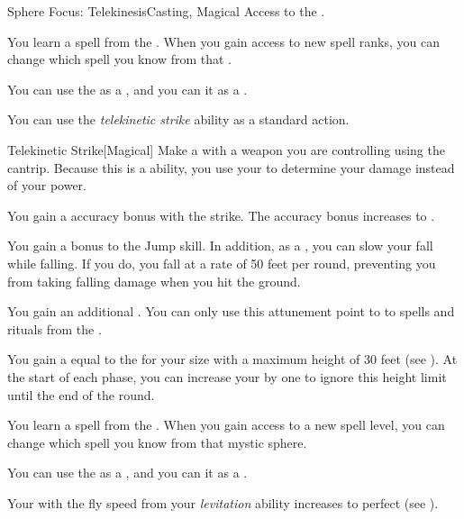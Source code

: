     \begin{feat}{Sphere Focus: Telekinesis}{Casting, Magical}
        \featpre Access to the  .

         You learn a spell from the  .
        When you gain access to new spell ranks, you can change which spell you know from that .

         You can use the   as a , and you can  it as a .

         You can use the \textit{telekinetic strike} ability as a standard action.
        \begin{freeability}{Telekinetic Strike}[Magical]
            Make a  with a weapon you are controlling using the  cantrip.
            Because this is a  ability, you use your   to determine your damage instead of your  power.

            \rankline
             You gain a  accuracy bonus with the strike.
             The accuracy bonus increases to .
        \end{freeability}

         You gain a  bonus to the Jump skill.
        In addition, as a , you can slow your fall while falling.
        If you do, you fall at a rate of 50 feet per round, preventing you from taking falling damage when you hit the ground.

         You gain an additional .
        You can only use this attunement point to  to spells and rituals from the  .

         You gain a  equal to the  for your size with a maximum height of 30 feet (see ).
        At the start of each phase, you can increase your  by one to ignore this height limit until the end of the round.

         You learn a spell from the  .
        When you gain access to a new spell level, you can change which spell you know from that mystic sphere.

         You can use the   as a , and you can  it as a .

         Your  with the fly speed from your \textit{levitation} ability increases to perfect (see ).
    \end{feat}

